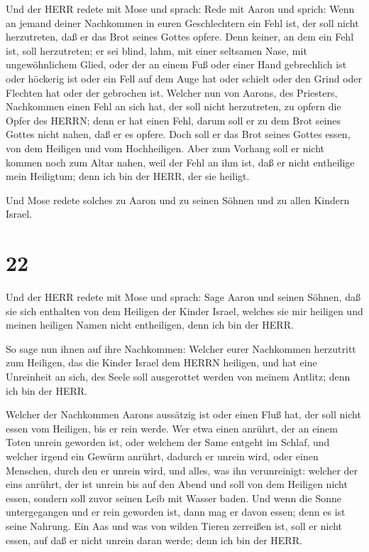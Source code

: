  Und der HERR redete mit Mose und sprach: 
Rede mit Aaron und sprich: Wenn an jemand deiner Nachkommen in euren
Geschlechtern ein Fehl ist, der soll nicht herzutreten, daß er das Brot
seines Gottes opfere.  Denn keiner, an dem ein Fehl ist,
soll herzutreten; er sei blind, lahm, mit einer seltsamen Nase, mit
ungewöhnlichem Glied,  oder der an einem Fuß oder einer
Hand gebrechlich ist  oder höckerig ist oder ein Fell auf
dem Auge hat oder schielt oder den Grind oder Flechten hat oder der
gebrochen ist.  Welcher nun von Aarons, des Priesters,
Nachkommen einen Fehl an sich hat, der soll nicht herzutreten, zu opfern
die Opfer des HERRN; denn er hat einen Fehl, darum soll er zu dem Brot
seines Gottes nicht nahen, daß er es opfere.  Doch soll er
das Brot seines Gottes essen, von dem Heiligen und vom Hochheiligen.
 Aber zum Vorhang soll er nicht kommen noch zum Altar
nahen, weil der Fehl an ihm ist, daß er nicht entheilige mein Heiligtum;
denn ich bin der HERR, der sie heiligt.

 Und Mose redete solches zu Aaron und zu seinen Söhnen und
zu allen Kindern Israel.

\hypertarget{section-21}{%
\section{22}\label{section-21}}

 Und der HERR redete mit Mose und sprach:  Sage
Aaron und seinen Söhnen, daß sie sich enthalten von dem Heiligen der
Kinder Israel, welches sie mir heiligen und meinen heiligen Namen nicht
entheiligen, denn ich bin der HERR.

 So sage nun ihnen auf ihre Nachkommen: Welcher eurer
Nachkommen herzutritt zum Heiligen, das die Kinder Israel dem HERRN
heiligen, und hat eine Unreinheit an sich, des Seele soll ausgerottet
werden von meinem Antlitz; denn ich bin der HERR.

 Welcher der Nachkommen Aarons aussätzig ist oder einen Fluß
hat, der soll nicht essen vom Heiligen, bis er rein werde. Wer etwa
einen anrührt, der an einem Toten unrein geworden ist, oder welchem der
Same entgeht im Schlaf,  und welcher irgend ein Gewürm
anrührt, dadurch er unrein wird, oder einen Menschen, durch den er
unrein wird, und alles, was ihn verunreinigt:  welcher der
eins anrührt, der ist unrein bis auf den Abend und soll von dem Heiligen
nicht essen, sondern soll zuvor seinen Leib mit Wasser baden.
 Und wenn die Sonne untergegangen und er rein geworden ist,
dann mag er davon essen; denn es ist seine Nahrung.  Ein Aas
und was von wilden Tieren zerreißen ist, soll er nicht essen, auf daß er
nicht unrein daran werde; denn ich bin der HERR.

